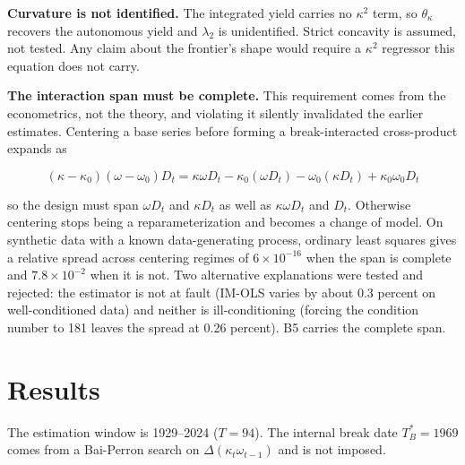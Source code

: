 \documentclass[11pt,a4paper]{article}
\begin{document}
\textbf{Curvature is not identified.} The integrated yield carries no $\kappa^2$ term, so $\theta_{\kappa}$ recovers the autonomous yield and $\lambda_2$ is unidentified. Strict concavity is assumed, not tested. Any claim about the frontier's shape would require a $\kappa^2$ regressor this equation does not carry.

\textbf{The interaction span must be complete.} This requirement comes from the econometrics, not the theory, and violating it silently invalidated the earlier estimates. Centering a base series before forming a break-interacted cross-product expands as

\begin{equation}
(\kappa - \kappa_0)(\omega - \omega_0)D_t = \kappa\omega D_t - \kappa_0(\omega D_t) - \omega_0(\kappa D_t) + \kappa_0\omega_0 D_t
\end{equation}

so the design must span $\omega D_t$ and $\kappa D_t$ as well as $\kappa\omega D_t$ and $D_t$. Otherwise centering stops being a reparameterization and becomes a change of model. On synthetic data with a known data-generating process, ordinary least squares gives a relative spread across centering regimes of $6\times10^{-16}$ when the span is complete and $7.8\times10^{-2}$ when it is not. Two alternative explanations were tested and rejected: the estimator is not at fault (IM-OLS varies by about 0.3 percent on well-conditioned data) and neither is ill-conditioning (forcing the condition number to 181 leaves the spread at 0.26 percent). B5 carries the complete span.

\FloatBarrier
\section{Results}

The estimation window is 1929--2024 ($T = 94$). The internal break date $T_B^{*} = 1969$ comes from a Bai-Perron search on $\Delta(\kappa_t\omega_{t-1})$ and is not imposed.
\end{document}
